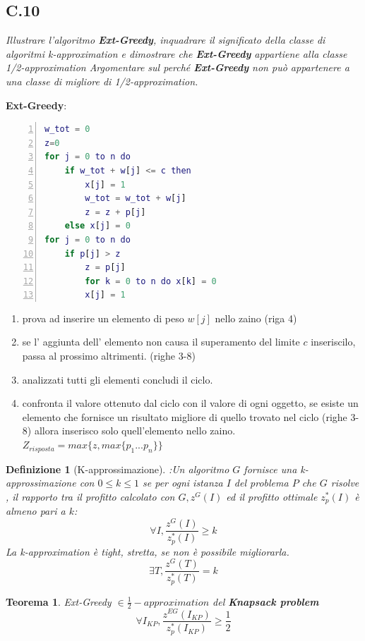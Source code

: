 \documentclass[a4paper]{article}
\newtheorem*{theorem}{Teorema}
\newtheorem*{definition}{Definizione}
\begin{document}
\subsection{C.10}
\emph{Illustrare l'algoritmo \textbf{Ext-Greedy}, inquadrare il significato della classe di algoritmi k-approximation e dimostrare che \textbf{Ext-Greedy} appartiene alla classe 1/2-approximation Argomentare sul perché \textbf{Ext-Greedy} non può appartenere a una classe di migliore di 1/2-approximation.}


\textbf{Ext-Greedy}:
		\begin{lstlisting}[numbers=left,firstnumber=1,language=Matlab, stepnumber=1, xleftmargin=10pt]
w_tot = 0
z=0
for j = 0 to n do
	if w_tot + w[j] <= c then
		x[j] = 1
		w_tot = w_tot + w[j]
		z = z + p[j]
	else x[j] = 0
for j = 0 to n do
	if p[j] > z
		z = p[j]
		for k = 0 to n do x[k] = 0
		x[j] = 1
		\end{lstlisting}
		\begin{enumerate}
			\item prova ad inserire un elemento di peso $w[j]$ nello zaino (riga 4)
			\item se l' aggiunta dell' elemento non causa il superamento del limite $c$ inseriscilo, passa al prossimo altrimenti. (righe 3-8)
			\item analizzati tutti gli elementi concludi il ciclo.
			\item confronta il valore ottenuto dal ciclo con il valore di ogni oggetto, se esiste un elemento che fornisce un risultato migliore di quello trovato nel ciclo (righe 3-8) allora inserisco solo quell'elemento nello zaino. $Z_{risposta} = max\{z, max\{p_1 ... p_n\}\}$
		\end{enumerate}
		\begin{definition}[K-approssimazione]:Un algoritmo $G$ fornisce una \textit{k-approssimazione} con $0 \leq k \leq 1$ se per ogni istanza $I$ del problema $P$ che $G$ risolve , il rapporto tra il profitto calcolato con $G, z^G(I)$ ed il profitto ottimale $z^*_p(I)$ è almeno pari a $k$:
			$$\forall I, \frac{z^G(I)}{z^*_p(I)} \geq k$$
		La k-approximation è tight, stretta, se non è possibile migliorarla.
			$$\exists T, \frac{z^G(T)}{z^*_p(T)}=k$$
\end{definition}
\begin{theorem} Ext-Greedy $\in \frac{1}{2}-approximation$ del \textbf{Knapsack problem}
$$\forall I_{KP}, \frac{z^{EG}(I_{KP})}{z^*_p(I_{KP})} \geq \frac{1}{2}$$
\end{theorem}
\end{document}
